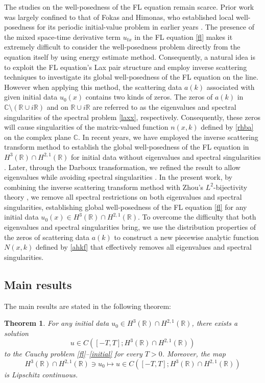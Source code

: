 \documentclass[preprint,compress,12pt]{elsarticle}
\newtheorem{theorem}{Theorem}[section]
\numberwithin{equation}{section}
\begin{document}
The  studies on the well-posedness of the FL equation remain scarce.  Prior work was largely confined to that of Fokas and Himonas, who established local well-posedness for its periodic initial-value problem in earlier years  \cite{FLci}. The presence of the mixed space-time derivative term $u_{tx}$ in the FL equation \eqref{fl} makes it extremely difficult to consider the well-posedness problem directly from the equation itself by using energy estimate method. Consequently, a natural idea is to exploit the FL equation's Lax pair structure and employ inverse scattering techniques to investigate its global well-posedness of the FL equation on the line.
However   when applying this method,
the scattering data $a(k)$  associated with given initial data $u_0(x)$   contains  two kinds  of  zeros.  The  zeros of $a(k)$ in $\mathbb{C}\setminus(\mathbb{R}\cup i \mathbb{R})$ and on $\mathbb{R}\cup i \mathbb{R}$ are referred to as    the eigenvalues   and spectral singularities of the spectral problem  \eqref{laxx}, respectively.
Consequently, these zeros  will cause  singularities of the  matrix-valued   function $n(x,k)$    defined  by \eqref{rhba} on the complex plane $\mathbb{C}$.
In recent years, we have   employed the inverse scattering transform  method to establish the global well-posedness of the FL equation in $H^{3}(\mathbb{R})\cap H^{2,1}(\mathbb{R})$ for initial data without eigenvalues and spectral singularities \cite{Chengglo}. Later, through the Darboux transformation, we refined the result to allow eigenvalues while avoiding spectral singularities \cite{Chengsoli}.  In the present work, by combining the inverse scattering transform method \cite{Beals} with Zhou's $L^{2}$-bijectivity theory \cite{Zhou1998}, we remove all spectral restrictions on both
 eigenvalues and spectral singularities, establishing global well-posedness of the FL equation \eqref{fl} for any initial data   $u_0(x)\in H^{3}(\mathbb{R})\cap H^{2,1}(\mathbb{R})$.
  To overcome the  difficulty that both  eigenvalues    and  spectral singularities   bring,  we use the distribution properties of the zeros  of  scattering data $a(k)$ to construct a new piecewise analytic function $N(x,k)$ defined by  \eqref{ahkf}  that effectively removes all eigenvalues  and spectral singularities.


\subsection{Main results}
The main results are stated in the following theorem:
\begin{theorem}\label{thm}
For any initial data $u_{0}\in H^{3}(\mathbb{R})\cap H^{2,1}(\mathbb{R})$, there exists a solution
\begin{equation*}
u\in C\left(\left[-T,T\right];H^{3}(\mathbb{R})\cap H^{2,1}(\mathbb{R})\right)
\end{equation*}
to the Cauchy problem \eqref{fl}--\eqref{initial} for every $T>0$. Moreover, the map
\begin{equation*}
H^{3}(\mathbb{R})\cap H^{2,1}(\mathbb{R})\ni u_{0}\longmapsto u \in C\left([-T,T]; H^{3}(\mathbb{R})\cap H^{2,1}(\mathbb{R})\right)
\end{equation*}
is Lipschitz continuous.
\end{theorem}
\end{document}
